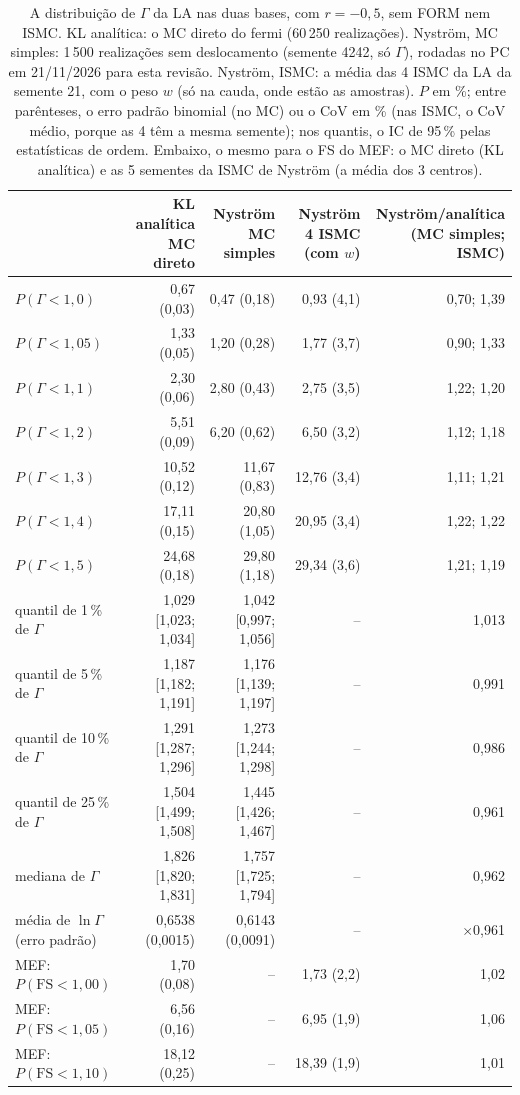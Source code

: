 \begin{table}[H]\centering\footnotesize\setlength{\tabcolsep}{4pt}
\caption{A distribuição de $\Gamma$ da LA nas duas bases, com $r = -0{,}5$, sem FORM nem ISMC. KL analítica: o MC direto do fermi (60\,250 realizações). Nyström, MC simples: 1\,500 realizações sem deslocamento (semente 4242, só $\Gamma$), rodadas no PC em 21/11/2026 para esta revisão. Nyström, ISMC: a média das 4 ISMC da LA da semente 21, com o peso $w$ (só na cauda, onde estão as amostras). $P$ em \%; entre parênteses, o erro padrão binomial (no MC) ou o CoV em \% (nas ISMC, o CoV médio, porque as 4 têm a mesma semente); nos quantis, o IC de 95\,\% pelas estatísticas de ordem. Embaixo, o mesmo para o FS do MEF: o MC direto (KL analítica) e as 5 sementes da ISMC de Nyström (a média dos 3 centros).}\label{tab:lanys}
\begin{tabular}{lrrrr}\toprule
 & \makecell{KL analítica\\MC direto} & \makecell{Nyström\\MC simples} & \makecell{Nyström\\4 ISMC (com $w$)} & \makecell{Nyström/analítica\\(MC simples; ISMC)} \\\midrule
$P(\Gamma < 1,0)$ & 0,67 (0,03) & 0,47 (0,18) & 0,93 (4,1) & 0,70; 1,39 \\
$P(\Gamma < 1,05)$ & 1,33 (0,05) & 1,20 (0,28) & 1,77 (3,7) & 0,90; 1,33 \\
$P(\Gamma < 1,1)$ & 2,30 (0,06) & 2,80 (0,43) & 2,75 (3,5) & 1,22; 1,20 \\
$P(\Gamma < 1,2)$ & 5,51 (0,09) & 6,20 (0,62) & 6,50 (3,2) & 1,12; 1,18 \\
$P(\Gamma < 1,3)$ & 10,52 (0,12) & 11,67 (0,83) & 12,76 (3,4) & 1,11; 1,21 \\
$P(\Gamma < 1,4)$ & 17,11 (0,15) & 20,80 (1,05) & 20,95 (3,4) & 1,22; 1,22 \\
$P(\Gamma < 1,5)$ & 24,68 (0,18) & 29,80 (1,18) & 29,34 (3,6) & 1,21; 1,19 \\
\midrule
quantil de 1\,\% de $\Gamma$ & 1,029 [1,023; 1,034] & 1,042 [0,997; 1,056] & -- & 1,013 \\
quantil de 5\,\% de $\Gamma$ & 1,187 [1,182; 1,191] & 1,176 [1,139; 1,197] & -- & 0,991 \\
quantil de 10\,\% de $\Gamma$ & 1,291 [1,287; 1,296] & 1,273 [1,244; 1,298] & -- & 0,986 \\
quantil de 25\,\% de $\Gamma$ & 1,504 [1,499; 1,508] & 1,445 [1,426; 1,467] & -- & 0,961 \\
mediana de $\Gamma$ & 1,826 [1,820; 1,831] & 1,757 [1,725; 1,794] & -- & 0,962 \\
média de $\ln\Gamma$ (erro padrão) & 0,6538 (0,0015) & 0,6143 (0,0091) & -- & $\times$0,961 \\
\midrule
MEF: $P(\mathrm{FS} < 1,00)$ & 1,70 (0,08) & -- & 1,73 (2,2) & 1,02 \\
MEF: $P(\mathrm{FS} < 1,05)$ & 6,56 (0,16) & -- & 6,95 (1,9) & 1,06 \\
MEF: $P(\mathrm{FS} < 1,10)$ & 18,12 (0,25) & -- & 18,39 (1,9) & 1,01 \\
\bottomrule\end{tabular}\end{table}
